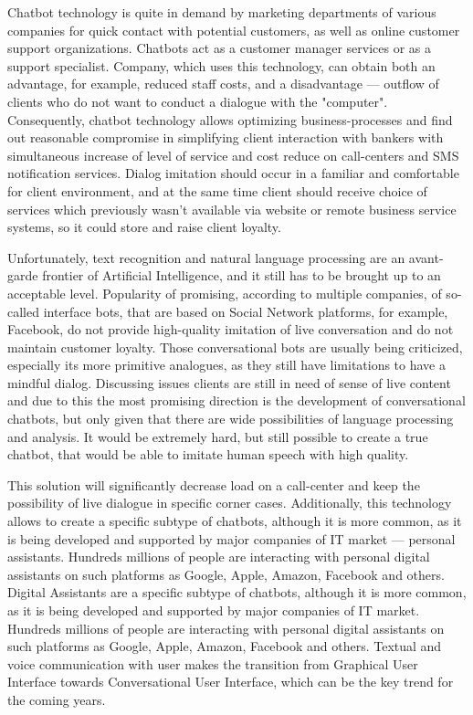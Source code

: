 Chatbot technology is quite in demand by marketing departments of various companies for quick contact with potential customers, as well as online customer support organizations.
Chatbots act as a customer manager services or as a support specialist.
Company, which uses this technology, can obtain both an advantage, for example, reduced staff costs, and a disadvantage — outflow of clients who do not want to conduct a dialogue with the "computer". 
Consequently, chatbot technology allows optimizing business-processes and find out reasonable compromise in simplifying client interaction with bankers with simultaneous increase of level of service and cost reduce on call-centers and SMS notification services.
Dialog imitation should occur in a familiar and comfortable for client environment, and at the same time client should receive choice of services which previously wasn't available via website or remote business service systems, so it could store and raise client loyalty.

Unfortunately, text recognition and natural language processing are an avant-garde frontier of Artificial Intelligence, and it still has to be brought up to an acceptable level.
Popularity of promising, according to multiple companies, of so-called interface bots, that are based on Social Network platforms, for example, Facebook, do not provide high-quality imitation of live conversation and do not maintain customer loyalty.
Those conversational bots are usually being criticized, especially its more primitive analogues,  as they still have limitations to have a mindful dialog.
Discussing issues clients are still in need of sense of live content and due to this the most promising direction is the development of conversational chatbots, but only given that there are wide possibilities of language processing and analysis.
It would be extremely hard, but still possible to create a true chatbot, that would be able to imitate human speech with high quality.

This solution will significantly decrease load on a call-center and keep the possibility of live dialogue in specific corner cases.
Additionally, this technology allows to create a specific subtype of chatbots, although it is more common, as it is being developed and supported by major companies of IT market — personal assistants.
Hundreds millions of people are interacting with personal digital assistants on such platforms as Google, Apple, Amazon, Facebook and others.
Digital Assistants are a specific subtype of chatbots, although it is more common, as it is being developed and supported by major companies of IT market.
Hundreds millions of people are interacting with personal digital assistants on such platforms as Google, Apple, Amazon, Facebook and others.
Textual and voice communication with user makes the transition from Graphical User Interface towards Conversational User Interface, which can be the key trend for the coming years.


